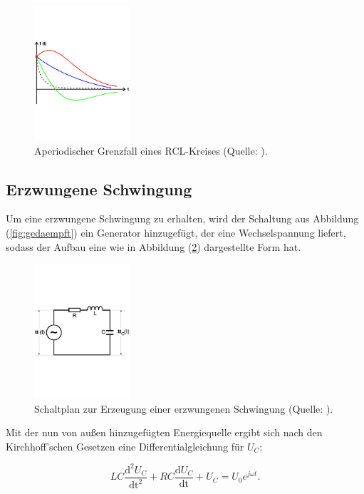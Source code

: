 \begin{enumerate}
\begin{figure}
    \centering
       \includegraphics[height=5cm]{grenzfall.pdf}
       \caption{Aperiodischer Grenzfall eines RCL-Kreises (Quelle: \cite{V354}).}
       \label{fig:grenzfall}
\end{figure}

\end{enumerate}

\subsection{Erzwungene Schwingung}
Um eine erzwungene Schwingung zu erhalten, wird der Schaltung aus Abbildung (\ref{fig:gedaempft}) ein Generator hinzugefügt,
der eine Wechselspannung liefert, sodass der Aufbau eine wie in Abbildung (\ref{fig:erzwungen}) dargestellte Form hat.

\begin{figure}
    \centering
       \includegraphics[height=5cm]{erzwungen.pdf}
       \caption{Schaltplan zur Erzeugung einer erzwungenen Schwingung (Quelle: \cite{V354}).}
       \label{fig:erzwungen}
\end{figure}

\noindent
Mit der nun von außen hinzugefügten Energiequelle ergibt sich nach den Kirchhoff'schen Gesetzen eine Differentialgleichung für $U_C$:

\begin{equation}
LC \frac{\text{d}^2 U_C}{\text{dt}^2} + RC \frac{\text{d} U_C}{\text{dt}} + U_C = U_0 e^{j \omega t}.
\end{equation}

